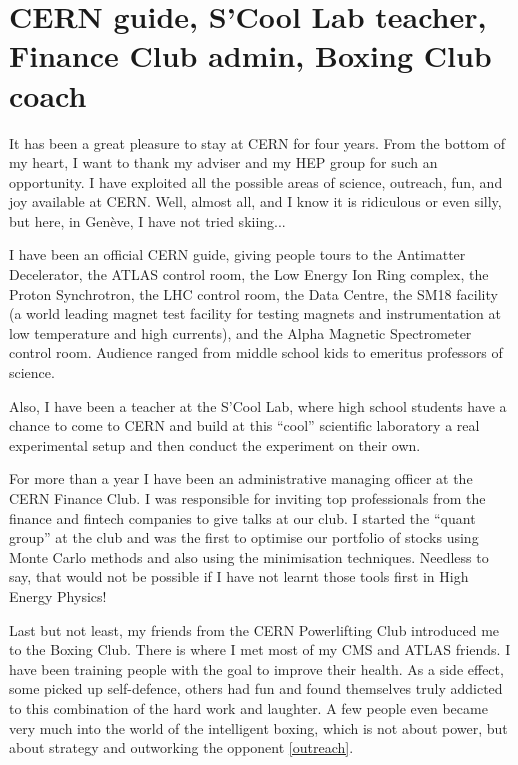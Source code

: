 \section*{CERN guide, S'Cool Lab teacher, Finance Club admin, Boxing Club coach}
\small

It has been a great pleasure to stay at CERN for four years. From the bottom of my heart, I want to thank my adviser and my HEP group for such an opportunity. I have exploited all the possible areas of science, outreach, fun, and joy available at CERN. Well, almost all, and I know it is ridiculous or even silly, but here, in Gen\`eve, I have not tried skiing...

I have been an official CERN guide, giving people tours to the Antimatter Decelerator, the ATLAS control room, the Low Energy Ion Ring complex, the Proton Synchrotron, the LHC control room, the Data Centre, the SM18 facility (a world leading magnet test facility for testing magnets and instrumentation at low temperature and high currents), and the Alpha Magnetic Spectrometer control room. Audience ranged from middle school kids to emeritus professors of science. 

Also, I have been a teacher at the S'Cool Lab, where high school students have a chance to come to CERN and build at this ``cool'' scientific laboratory a real experimental setup and then conduct the experiment on their own. 

For more than a year I have been an administrative managing officer at the CERN Finance Club. I was responsible for inviting top professionals from the finance and fintech companies to give talks at our club. I started the ``quant group'' at the club and was the first to optimise our portfolio of stocks using Monte Carlo methods and also using the minimisation techniques. Needless to say, that would not be possible if I have not learnt those tools first in High Energy Physics!

Last but not least, my friends from the CERN Powerlifting Club introduced me to the Boxing Club. There is where I met most of my CMS and ATLAS friends. I have been training people with the goal to improve their health. As a side effect, some picked up self-defence, others had fun and found themselves truly addicted to this combination of the hard work and laughter. A few people even became very much into the world of the intelligent boxing, which is not about power, but about strategy and outworking the opponent \ref{outreach}. 


\iffalse

